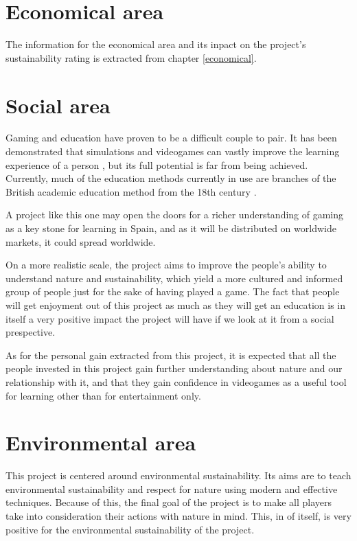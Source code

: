 \section{Economical area}

The information for the economical area and its inpact on the project's sustainability rating is extracted from chapter \ref{economical}.

\section{Social area}

Gaming and education have proven to be a difficult couple to pair. It has been demonstrated that simulations and videogames can vastly improve the learning experience of a person
, but its full potential is far from being achieved. Currently, much of the education methods currently in use are branches of the British academic education method from the 18th century
.

A project like this one may open the doors for a richer understanding of gaming as a key stone for learning in Spain, and as it will be distributed on worldwide markets, it could spread worldwide.

On a more realistic scale, the project aims to improve the people's ability to understand nature and sustainability, which yield a more cultured and informed group of people just for the sake of having played a game. The fact that people will get enjoyment out of this project as much as they will get an education is in itself a very positive impact the project will have if we look at it from a social prespective. 

As for the personal gain extracted from this project, it is expected that
all the people invested in this project gain further understanding about
nature and our relationship with it, and that they gain confidence in 
videogames as a useful tool for learning other than for entertainment only.

\section{Environmental area}

This project is centered around environmental sustainability. Its aims are to teach environmental sustainability and respect for nature using modern and effective techniques. Because of this, the final goal of the project is to make all players take into consideration their actions with nature in mind. This, in of itself, is very positive for the environmental sustainability of the project. 

